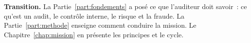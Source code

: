 \bigskip

\begin{boxinfo}
\textbf{Transition.} La Partie~\ref{part:fondements} a posé ce que l'auditeur
doit savoir~: ce qu'est un audit, le contrôle interne, le risque et la
fraude. La Partie~\ref{part:methode} enseigne comment conduire la mission.
Le Chapitre~\ref{chap:mission} en présente les principes et le cycle.
\end{boxinfo}
